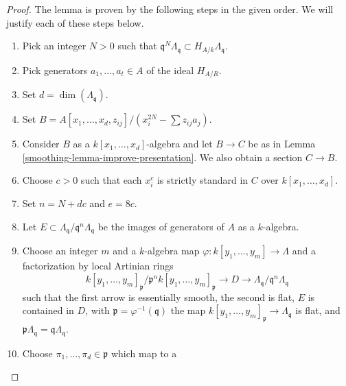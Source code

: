 \begin{proof}

The lemma is proven by the following steps in the given order.
We will justify each of these steps below.
\begin{enumerate}
\item
\label{smoothing-item-power}
Pick an integer $N > 0$ such that
$\mathfrak q^N\Lambda_\mathfrak q \subset H_{A/k}\Lambda_\mathfrak q$.
\item
\label{smoothing-item-generators}
Pick generators $a_1, \ldots, a_t \in A$ of the ideal $H_{A/R}$.
\item
\label{smoothing-item-dimension}
Set $d = \dim(\Lambda_\mathfrak q)$.
\item
\label{smoothing-item-standardizer}
Set $B = A[x_1, \ldots, x_d, z_{ij}]/(x_i^{2N} - \sum z_{ij}a_j)$.
\item
\label{smoothing-item-elkik}
Consider $B$ as a $k[x_1, \ldots, x_d]$-algebra and let
$B \to C$ be as in
Lemma \ref{smoothing-lemma-improve-presentation}.
We also obtain a section $C \to B$.
\item
\label{smoothing-item-strictly-standard}
Choose $c > 0$ such that each $x_i^c$
is strictly standard in $C$ over $k[x_1, \ldots, x_d]$.
\item
\label{smoothing-item-set-n}
Set $n = N + dc$ and $e = 8c$.
\item
\label{smoothing-item-set-E}
Let $E \subset \Lambda_\mathfrak q/\mathfrak q^n\Lambda_\mathfrak q$
be the images of generators of $A$ as a $k$-algebra.
\item
\label{smoothing-item-NP}
Choose an integer $m$ and a $k$-algebra map
$\varphi : k[y_1, \ldots, y_m] \to \Lambda$
and a factorization by local Artinian rings
$$
k[y_1, \ldots, y_m]_\mathfrak p/\mathfrak p^n k[y_1, \ldots, y_m]_\mathfrak p
\to D \to
\Lambda_\mathfrak q/\mathfrak q^n\Lambda_\mathfrak q
$$
such that the first arrow is essentially smooth, the second is flat,
$E$ is contained in $D$, with $\mathfrak p = \varphi^{-1}(\mathfrak q)$
the map $k[y_1, \ldots, y_m]_\mathfrak p \to \Lambda_\mathfrak q$ is
flat, and $\mathfrak p \Lambda_\mathfrak q = \mathfrak q \Lambda_\mathfrak q$.
\item
\label{smoothing-item-choose-pii}
Choose $\pi_1, \ldots, \pi_d \in \mathfrak p$ which map to a

\end{enumerate}
\end{proof}
